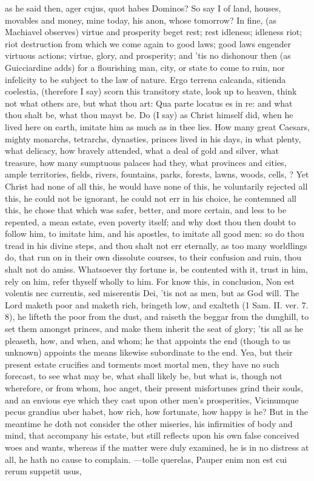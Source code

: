 {as he said then, ager cujus, quot habes Dominos? So say I of land,
houses, movables and money, mine today, his anon, whose tomorrow? In
fine, (as Machiavel observes) virtue and prosperity beget rest;
rest idleness; idleness riot; riot destruction from which we come again
to good laws; good laws engender virtuous actions; virtue, glory, and
prosperity; and 'tis no dishonour then (as Guicciardine adds) for a
flourishing man, city, or state to come to ruin, nor infelicity
to be subject to the law of nature. Ergo terrena calcanda, sitienda
coelestia, (therefore I say) scorn this transitory state, look up to
heaven, think not what others are, but what thou art: Qua parte
locatus es in re: and what thou shalt be, what thou mayst be. Do (I
say) as Christ himself did, when he lived here on earth, imitate him as
much as in thee lies. How many great Caesars, mighty monarchs,
tetrarchs, dynasties, princes lived in his days, in what plenty, what
delicacy, how bravely attended, what a deal of gold and silver, what
treasure, how many sumptuous palaces had they, what provinces and
cities, ample territories, fields, rivers, fountains, parks, forests,
lawns, woods, cells, \etc{}? Yet Christ had none of all this, he would
have none of this, he voluntarily rejected all this, he could not be
ignorant, he could not err in his choice, he contemned all this, he
chose that which was safer, better, and more certain, and less to be
repented, a mean estate, even poverty itself; and why dost thou then
doubt to follow him, to imitate him, and his apostles, to imitate all
good men: so do thou tread in his divine steps, and thou shalt not err
eternally, as too many worldlings do, that run on in their own
dissolute courses, to their confusion and ruin, thou shalt not do
amiss. Whatsoever thy fortune is, be contented with it, trust in him,
rely on him, refer thyself wholly to him. For know this, in conclusion,
Non est volentis nec currentis, sed miserentis Dei, 'tis not as men,
but as God will. The Lord maketh poor and maketh rich, bringeth low,
and exalteth (1 Sam. II. ver. 7. 8), he lifteth the poor from the dust,
and raiseth the beggar from the dunghill, to set them amongst princes,
and make them inherit the seat of glory; 'tis all as he pleaseth, how,
and when, and whom; he that appoints the end (though to us unknown)
appoints the means likewise subordinate to the end.
Yea, but their present estate crucifies and torments most mortal men,
they have no such forecast, to see what may be, what shall likely be,
but what is, though not wherefore, or from whom, hoc anget, their
present misfortunes grind their souls, and an envious eye which they
cast upon other men's prosperities, Vicinumque pecus grandius uber
habet, how rich, how fortunate, how happy is he? But in the meantime he
doth not consider the other miseries, his infirmities of body and mind,
that accompany his estate, but still reflects upon his own false
conceived woes and wants, whereas if the matter were duly examined,
he is in no distress at all, he hath no cause to complain.
---tolle querelas,
Pauper enim non est cui rerum suppetit usus,

}
